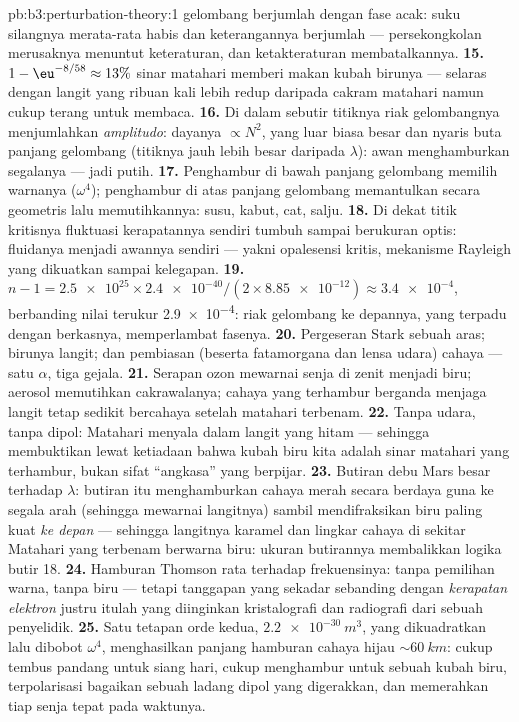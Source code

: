 \begin{solution}{pb:b3:perturbation-theory:1}
gelombang berjumlah dengan fase acak: suku silangnya merata-rata habis
dan keterangannya berjumlah --- persekongkolan merusaknya menuntut
keteraturan, dan ketakteraturan membatalkannya.
\textbf{15.} $1 - \eu^{-8/58} \approx 13\%$ sinar matahari memberi makan
kubah birunya --- selaras dengan langit yang ribuan kali lebih redup
daripada cakram matahari namun cukup terang untuk membaca.
\textbf{16.} Di dalam sebutir titiknya riak gelombangnya menjumlahkan
\emph{amplitudo}: dayanya $\propto N^2$, yang luar biasa besar dan
nyaris buta panjang gelombang (titiknya jauh lebih besar daripada
$\lambda$): awan menghamburkan segalanya --- jadi putih.
\textbf{17.} Penghambur di bawah panjang gelombang memilih warnanya
($\omega^4$); penghambur di atas panjang gelombang memantulkan secara
geometris lalu memutihkannya: susu, kabut, cat, salju.
\textbf{18.} Di dekat titik kritisnya fluktuasi kerapatannya sendiri
tumbuh sampai berukuran optis: fluidanya menjadi awannya sendiri ---
yakni opalesensi kritis, mekanisme Rayleigh yang dikuatkan sampai
kelegapan.
\textbf{19.} $n - 1 = \num{2.5e25} \times \num{2.4e-40}/(2 \times
\num{8.85e-12}) \approx \num{3.4e-4}$, berbanding nilai terukur
\num{2.9e-4}: riak gelombang ke depannya, yang terpadu dengan berkasnya,
memperlambat fasenya.
\textbf{20.} Pergeseran Stark sebuah aras; birunya langit; dan
pembiasan (beserta fatamorgana dan lensa udara) cahaya --- satu
$\alpha$, tiga gejala.
\textbf{21.} Serapan ozon mewarnai senja di zenit menjadi biru; aerosol
memutihkan cakrawalanya; cahaya yang terhambur berganda menjaga langit
tetap sedikit bercahaya setelah matahari terbenam.
\textbf{22.} Tanpa udara, tanpa dipol: Matahari menyala dalam langit
yang hitam --- sehingga membuktikan lewat ketiadaan bahwa kubah biru
kita adalah sinar matahari yang terhambur, bukan sifat ``angkasa'' yang
berpijar.
\textbf{23.} Butiran debu Mars besar terhadap $\lambda$: butiran itu
menghamburkan cahaya merah secara berdaya guna ke segala arah (sehingga
mewarnai langitnya) sambil mendifraksikan biru paling kuat \emph{ke
depan} --- sehingga langitnya karamel dan lingkar cahaya di sekitar
Matahari yang terbenam berwarna biru: ukuran butirannya membalikkan
logika butir 18.
\textbf{24.} Hamburan Thomson rata terhadap frekuensinya: tanpa
pemilihan warna, tanpa biru --- tetapi tanggapan yang sekadar sebanding
dengan \emph{kerapatan elektron} justru itulah yang diinginkan
kristalografi dan radiografi dari sebuah penyelidik.
\textbf{25.} Satu tetapan orde kedua, $\qty{2.2e-30}{m^3}$, yang
dikuadratkan lalu dibobot $\omega^4$, menghasilkan panjang hamburan
cahaya hijau $\sim\qty{60}{km}$: cukup tembus pandang untuk siang hari,
cukup menghambur untuk sebuah kubah biru, terpolarisasi bagaikan sebuah
ladang dipol yang digerakkan, dan memerahkan tiap senja tepat pada
waktunya.
\end{solution}
